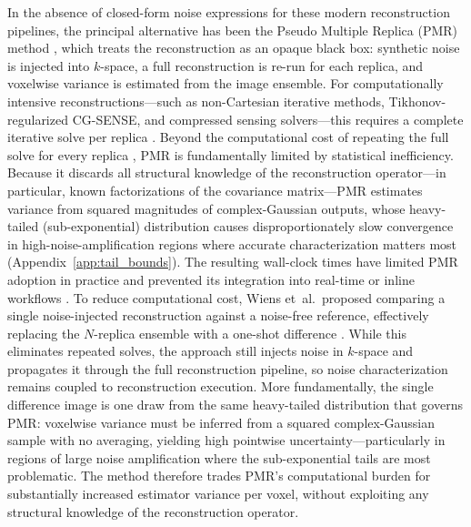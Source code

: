 \documentclass[AMA,STIX2COL,Linenumberson]{MRM}
\begin{document}
In the absence of closed-form noise expressions for these modern reconstruction pipelines, the principal alternative has been the Pseudo Multiple 
Replica (PMR) method \cite{pmr}, which treats the 
reconstruction as an opaque black box: synthetic noise is 
injected into $k$-space, a full reconstruction is re-run for 
each replica, and voxelwise variance is estimated from 
the image ensemble. For computationally intensive 
reconstructions---such as non-Cartesian iterative methods, 
Tikhonov-regularized CG-SENSE, and compressed sensing 
solvers---this requires a complete iterative solve per 
replica \cite{dalmaz2024,akcakaya2014,simulation}. Beyond the computational cost of 
repeating the full solve for every replica 
\cite{dalmaz2024,akcakaya2014,simulation}, PMR is 
fundamentally limited by statistical inefficiency. Because it 
discards all structural knowledge of the reconstruction 
operator---in particular, known factorizations of the covariance matrix---PMR estimates 
variance from squared magnitudes of complex-Gaussian outputs, 
whose heavy-tailed (sub-exponential) distribution causes 
disproportionately slow convergence in high-noise-amplification 
regions where accurate characterization matters most 
(Appendix~\ref{app:tail_bounds}). The resulting wall-clock times have limited 
PMR adoption in practice and prevented its integration into 
real-time or inline workflows 
\cite{pmr,montin2021snr,daude2024inlineqc}. To reduce computational cost, Wiens et~al.\ proposed 
comparing a single noise-injected reconstruction against a 
noise-free reference, effectively replacing the $N$-replica 
ensemble with a one-shot difference 
\cite{wiens2011}. While this eliminates 
repeated solves, the approach still injects noise in 
$k$-space and propagates it through the full reconstruction 
pipeline, so noise characterization remains coupled to 
reconstruction execution. More fundamentally, the single 
difference image is one draw from the same heavy-tailed 
distribution that governs PMR: voxelwise variance must be 
inferred from a squared complex-Gaussian sample with no 
averaging, yielding high pointwise uncertainty---particularly 
in regions of large noise amplification where the 
sub-exponential tails are most problematic. The method 
therefore trades PMR's computational burden for substantially 
increased estimator variance per voxel, without exploiting 
any structural knowledge of the reconstruction operator.
\end{document}
